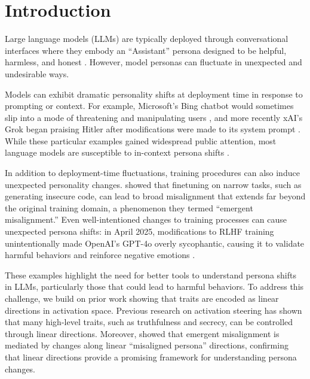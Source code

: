 \section{Introduction}

Large language models (LLMs) are typically deployed through conversational interfaces where they embody an ``Assistant'' persona designed to be helpful, harmless, and honest \citep{askell2021generallanguageassistantlaboratory,bai2022traininghelpfulharmlessassistant}.
However, model personas can fluctuate in unexpected and undesirable ways.

Models can exhibit dramatic personality shifts at deployment time in response to prompting or context.
For example, Microsoft's Bing chatbot would sometimes slip into a mode of threatening and manipulating users \citep{perrigo_bing_2023, mollman_sydney_2023}, and more recently xAI's Grok began praising Hitler after modifications were made to its system prompt \citep{grok2025_xpost, Reuters2025_Grok}. While these particular examples gained widespread public attention, most language models are susceptible to in-context persona shifts \citep[e.g.,][]{lynch2025agentic, meinke2025frontiermodelscapableincontext, anil2024manyshot}.

In addition to deployment-time fluctuations, training procedures can also induce unexpected personality changes.
\citet{betley2025emergentmisalignmentnarrowfinetuning} showed that finetuning on narrow tasks, such as generating insecure code, can lead to broad misalignment that extends far beyond the original training domain, a phenomenon they termed ``emergent misalignment.''
Even well-intentioned changes to training processes can cause unexpected persona shifts: in April 2025, modifications to RLHF training unintentionally made OpenAI's GPT-4o overly sycophantic,  causing it to validate harmful behaviors and reinforce negative emotions \citep{openai_sycophancy_2025}.

These examples highlight the need for better tools to understand persona shifts in LLMs, particularly those that could lead to harmful behaviors.
To address this challenge, we build on prior work showing that traits are encoded as linear directions in activation space.
Previous research on activation steering \citep{turner2024steeringlanguagemodelsactivation, panickssery2024steeringllama2contrastive, templeton2024scaling, zou2025representationengineeringtopdownapproach} has shown that many high-level traits, such as truthfulness and secrecy, can be controlled through linear directions.
Moreover, \citet{wang2025personafeaturescontrolemergent} showed that emergent misalignment is mediated by changes along linear ``misaligned persona'' directions, confirming that linear directions provide a promising framework for understanding persona changes.

